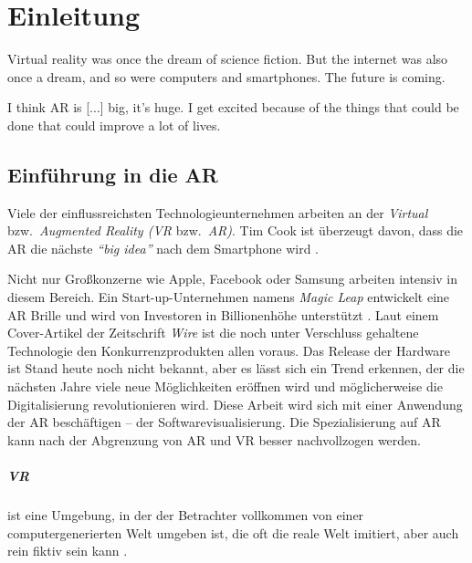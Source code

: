 \chapter{Einleitung}

\begin{fquote}
Virtual reality was once the dream of science fiction. But the internet was also once a dream, and so were computers and smartphones. The future is coming.
\end{fquote}

\begin{fquote}
I think AR is [...] big, it’s huge. I get excited because of the things that could be done that could improve a lot of lives.
\end{fquote}

\section{Einführung in die AR}
Viele der einflussreichsten Technologieunternehmen arbeiten an der \emph{Virtual} bzw.\ \emph{Augmented Reality (VR} bzw.\ \emph{AR)}. Tim Cook ist überzeugt davon, dass die AR die nächste \emph{``big idea''} nach dem Smartphone wird \cite{theindependent2017apple}.

Nicht nur Großkonzerne wie Apple, Facebook oder Samsung arbeiten intensiv in diesem Bereich. Ein Start-up-Unternehmen namens \emph{Magic Leap} entwickelt eine AR Brille und wird von Investoren in Billionenhöhe unterstützt \cite{kelly2016untold}. Laut einem Cover-Artikel der Zeitschrift \emph{Wire} ist die noch unter Verschluss gehaltene Technologie den Konkurrenzprodukten allen voraus. Das Release der Hardware ist Stand heute noch nicht bekannt, aber es lässt sich ein Trend erkennen, der die nächsten Jahre viele neue Möglichkeiten eröffnen wird und möglicherweise die Digitalisierung revolutionieren wird.
Diese Arbeit wird sich mit einer Anwendung der AR beschäftigen -- der Softwarevisualisierung. Die Spezialisierung auf AR kann nach der Abgrenzung von AR und VR besser nachvollzogen werden.

\paragraph{VR} ist eine Umgebung, in der der Betrachter vollkommen von einer computergenerierten Welt umgeben ist, die oft die reale Welt imitiert, aber auch rein fiktiv sein kann \cite{milgram1995augmented}.\\

